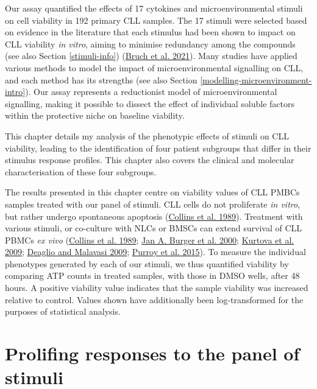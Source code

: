 \documentclass[11pt, a4paper, twosided]{book}
\begin{document}
Our assay quantified the effects of 17 cytokines and microenvironmental stimuli on cell viability in 192 primary CLL samples. The 17 stimuli were selected based on evidence in the literature that each stimulus had been shown to impact on CLL viability \emph{in vitro}, aiming to minimise redundancy among the compounds (see also Section \ref{stimuli-info}) (\protect\hyperlink{ref-Giles2021}{Bruch et al. 2021}). Many studies have applied various methods to model the impact of microenvironmental signalling on CLL, and each method has its strengths (see also Section \ref{modelling-microenvironment-intro}). Our assay represents a reductionist model of microenvironmental signalling, making it possible to dissect the effect of individual soluble factors within the protective niche on baseline viability.

This chapter details my analysis of the phenotypic effects of stimuli on CLL viability, leading to the identification of four patient subgroups that differ in their stimulus response profiles. This chapter also covers the clinical and molecular characterisation of these four subgroups.

The results presented in this chapter centre on viability values of CLL PMBCs samples treated with our panel of stimuli. CLL cells do not proliferate \emph{in vitro}, but rather undergo spontaneous apoptosis (\protect\hyperlink{ref-Collins1989}{Collins et al. 1989}). Treatment with various stimuli, or co-culture with NLCs or BMSCs can extend survival of CLL PBMCs \emph{ex vivo} (\protect\hyperlink{ref-Collins1989}{Collins et al. 1989}; \protect\hyperlink{ref-Burger2000}{Jan A. Burger et al. 2000}; \protect\hyperlink{ref-Kurtova2009}{Kurtova et al. 2009}; \protect\hyperlink{ref-Deaglio2009}{Deaglio and Malavasi 2009}; \protect\hyperlink{ref-Purroy2015}{Purroy et al. 2015}). To measure the individual phenotypes generated by each of our stimuli, we thus quantified viability by comparing ATP counts in treated samples, with those in DMSO wells, after 48 hours. A positive viability value indicates that the sample viability was increased relative to control. Values shown have additionally been log-transformed for the purposes of statistical analysis.

\hypertarget{prolifing-responses-to-the-panel-of-stimuli}{%
\section{Prolifing responses to the panel of stimuli}\label{prolifing-responses-to-the-panel-of-stimuli}}
\end{document}
